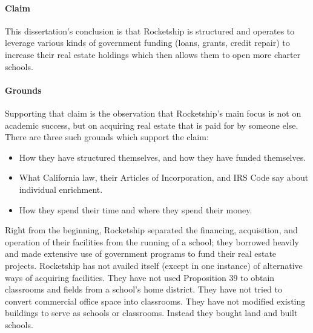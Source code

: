 \paragraph{Claim}\label{p:claim}
This dissertation's conclusion is that Rocketship is structured and operates to leverage various kinds of government funding (loans, grants, credit repair) to increase their real estate holdings which then allows them to open more charter schools.

\paragraph{Grounds}
Supporting that claim is the observation that Rocketship's main focus is not on academic success, but on acquiring real estate that is paid for by someone else. There are three such grounds which support the claim:
\begin{itemize}
  \item How they have structured themselves, and  how they have funded themselves.
  \item What California law, their Articles of Incorporation, and IRS Code say about individual enrichment.
  \item How they spend their time and where they spend their money.
\end{itemize}

Right from the beginning, Rocketship separated the financing, acquisition, and operation of their facilities from the running of a school; they borrowed heavily and made extensive use of government programs to fund their real estate projects. Rocketship has not availed itself (except in one instance) of alternative ways of acquiring facilities. They have not used Proposition 39 to obtain classrooms and fields from a school's home district. They have not tried to convert commercial office space into classrooms. They have not modified existing buildings to serve as schools or classrooms. Instead they bought land and built schools.

